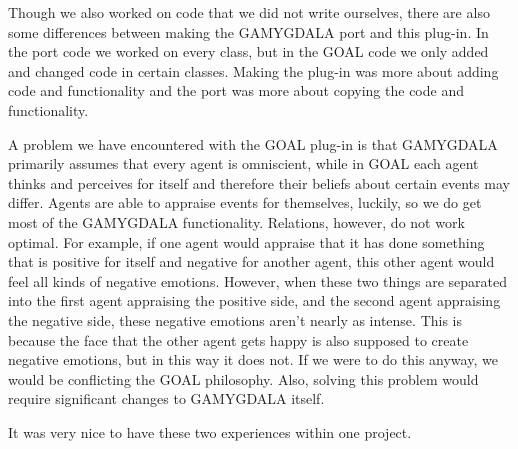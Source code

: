 Though we also worked on code that we did not write ourselves, there are also some differences between making the GAMYGDALA port and this plug-in. In the port code we worked on every class, but in the GOAL code we only added and changed code in certain classes. Making the plug-in was more about adding code and functionality and the port was more about copying the code and functionality.

A problem we have encountered with the GOAL plug-in is that GAMYGDALA primarily assumes that every agent is omniscient, while in GOAL each agent thinks and perceives for itself and therefore their beliefs about certain events may differ. Agents are able to appraise events for themselves, luckily, so we do get most of the GAMYGDALA functionality. Relations, however, do not work optimal. For example, if one agent would appraise that it has done something that is positive for itself and negative for another agent, this other agent would feel all kinds of negative emotions. However, when these two things are separated into the first agent appraising the positive side, and the second agent appraising the negative side, these negative emotions aren't nearly as intense. This is because the face that the other agent gets happy is also supposed to create negative emotions, but in this way it does not. If we were to do this anyway, we would be conflicting the GOAL philosophy. Also, solving this problem would require significant changes to GAMYGDALA itself.

It was very nice to have these two experiences within one project.


